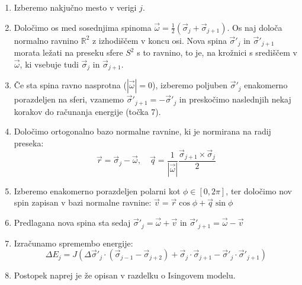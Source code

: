 \documentclass[a4paper]{article}
\newcommand{\half}{\frac{1}{2}}
\newcommand{\s}{\sigma}
\newcommand{\vs}{\vec{\s}}
\newcommand{\vr}{\vec{r}}
\newcommand{\vq}{\vec{q}}
\newcommand{\vv}{\vec{v}}
\newcommand{\vo}{\vec{\omega}}
\newcommand{\D}{\Delta}
\begin{document}
    \begin{enumerate}
        \item Izberemo nakjučno mesto v verigi $j$.
        \item Določimo os med sosednjima spinoma $\vo = \half (\vs_j + \vs_{j+1})$.
        Os naj določa normalno ravnino $\mathbb{R}^2$ z izhodiščem v koncu osi.
        Nova spina $\vs'_{j}$ in $\vs'_{j+1}$ morata ležati na preseku sfere $S^2$ s to ravnino, to je, na krožnici
        s središčem v $\vo$, ki vsebuje tudi $\vs_j$ in $\vs_{j+1}$.
        \item Če sta spina ravno nasprotna ($|\vo| = 0$), izberemo poljuben $\vs'_j$ enakomerno porazdeljen na sferi,
        vzamemo $\vs'_{j+1} = -\vs'_j$ in preskočimo naslednjih nekaj korakov do računanja energije (točka 7).
        \item Določimo ortogonalno bazo normalne ravnine, ki je normirana na radij preseka:
        \begin{equation}\label{eq12}
            \vr = \vs_{j} - \vo, \quad \vq = \frac{1}{|\vo|} \frac{\vs_{j+1} \times \vs_{j}}{2}
        \end{equation}
        \item Izberemo enakomerno porazdeljen polarni kot $\phi \in [0, 2\pi]$, ter določimo nov spin zapisan v bazi
        normalne ravnine: $\vv = \vr \cos{\phi} + \vq \sin{\phi}$
        \item Predlagana nova spina sta sedaj $\vs'_{j} = \vo + \vv$ in $\vs'_{j+1} = \vo - \vv$
        \item Izračunamo spremembo energije:
        \begin{equation}\label{eq13}
            \D E_j = J(\D \vs'_{j} \cdot (\vs_{j-1} - \vs_{j+2}) + \vs_j \cdot \vs_{j+1} - \vs'_j \cdot \vs'_{j+1})
        \end{equation}
        \item Postopek naprej je že opisan v razdelku o Isingovem modelu.
    \end{enumerate}

    \iffalse
    \begin{figure}
        \centering
        \texttt{[image: slika16.pdf]}
        \caption{Odvisnost toka $J$ med termostatom in verigo v odvisnosti od časa vzorčenja $\tau$.
        Računano je na anharmonski ($\lambda = 1$) verigi dolžine $N = 10$ in povprečeno po $1000$ vzorcih.
        $J_1$ se nanaša na tok na levi, $J_2$ pa na desni strani verige.}
        \label{slika6}
    \end{figure}
    \fi
\end{document}
